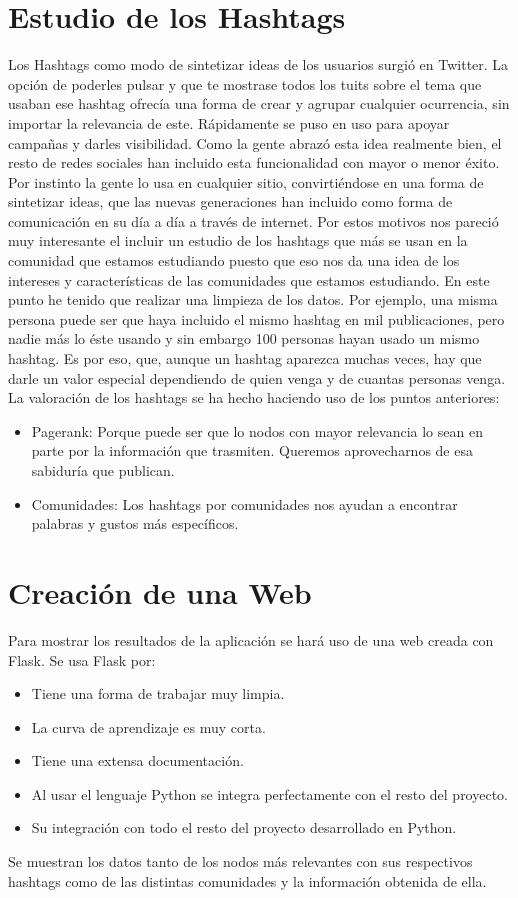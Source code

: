\section{Estudio de los Hashtags}
Los Hashtags como modo de sintetizar ideas de los usuarios surgió en Twitter. La opción de poderles pulsar y que te mostrase todos los tuits sobre el tema que usaban ese hashtag ofrecía una forma de crear y agrupar cualquier ocurrencia, sin importar la relevancia de este.
Rápidamente se puso en uso para apoyar campañas y darles visibilidad. Como la gente abrazó esta idea realmente bien, el resto de redes sociales han incluido esta funcionalidad con mayor o menor éxito. Por instinto la gente lo usa en cualquier sitio, convirtiéndose en una forma de sintetizar ideas, que las nuevas generaciones han incluido como forma de comunicación en su día a día a través de internet.
Por estos motivos nos pareció muy interesante el incluir un estudio de los hashtags que más se usan en la comunidad que estamos estudiando puesto que eso nos da una idea de los intereses y características de las comunidades que estamos estudiando.
En este punto he tenido que realizar una limpieza de los datos. Por ejemplo, una misma persona puede ser que haya incluido el mismo hashtag en mil publicaciones, pero nadie más lo éste usando y sin embargo 100 personas hayan usado un mismo hashtag. Es por eso, que, aunque un hashtag aparezca muchas veces, hay que darle un valor especial dependiendo de quien venga y de cuantas personas venga.
La valoración de los hashtags se ha hecho haciendo uso de los puntos anteriores:
\begin{itemize}
	\item Pagerank: Porque puede ser que lo nodos con mayor relevancia lo sean en parte por la información que trasmiten. Queremos aprovecharnos de esa sabiduría que publican.
	\item Comunidades: Los hashtags por comunidades nos ayudan a encontrar palabras y gustos más específicos.
\end{itemize}
\section{Creación de una Web}
Para mostrar los resultados de la aplicación se hará uso de una web creada con Flask.
Se usa Flask por:

\begin{itemize}
	\item Tiene una forma de trabajar muy limpia.
	\item La curva de aprendizaje es muy corta.
	\item Tiene una extensa documentación.
	\item Al usar el lenguaje Python se integra perfectamente con el resto del proyecto.
	\item Su integración con todo el resto del proyecto desarrollado en Python.
\end{itemize}
Se muestran los datos tanto de los nodos más relevantes con sus respectivos hashtags como de las distintas comunidades y la información obtenida de ella.

